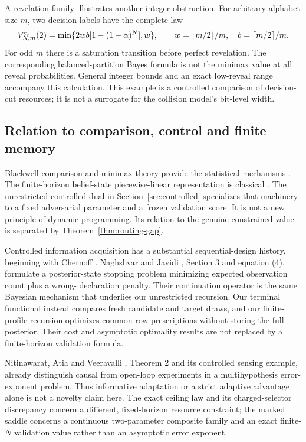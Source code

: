 A revelation family illustrates another integer obstruction. For
arbitrary alphabet size $m$, two decision labels have the complete law
\[
 V^{\rm er}_{N,m}(2)=\min\{2wb[1-(1-\alpha)^N],w\},\qquad
 w=\lfloor m/2\rfloor/m,\quad b=\lceil m/2\rceil/m.
\]
For odd $m$ there is a saturation transition before perfect revelation.
The corresponding balanced-partition Bayes formula is not the minimax
value at all reveal probabilities. General integer bounds and an exact
low-reveal range accompany this calculation. This example is a
controlled comparison of decision-cut resources; it is not a surrogate
for the collision model's bit-level width.

\subsection{Relation to comparison, control and finite memory}
Blackwell comparison and minimax theory provide the statistical
mechanisms \cite{Blackwell,Sion}. The finite-horizon belief-state
piecewise-linear representation is classical \cite{SmallwoodSondik}.
The unrestricted controlled dual in Section~\ref{sec:controlled}
specializes that machinery to a fixed adversarial parameter and a frozen
validation score. It is not a new principle of dynamic programming.
Its relation to the genuine constrained value is separated by
Theorem~\ref{thm:routing-gap}.

Controlled information acquisition has a substantial sequential-design
history, beginning with Chernoff \cite{Chernoff}. Naghshvar and Javidi
\cite{NJ}, Section 3 and equation (4), formulate a posterior-state
stopping problem minimizing expected observation count plus a wrong-
declaration penalty. Their continuation operator is the same Bayesian
mechanism that underlies our unrestricted recursion. Our terminal
functional instead compares fresh candidate and target draws, and our
finite-profile recursion optimizes common row prescriptions without
storing the full posterior. Their cost and asymptotic optimality results
are not replaced by a finite-horizon validation formula.

Nitinawarat, Atia and Veeravalli \cite{NAV}, Theorem 2 and its controlled
sensing example, already distinguish causal from open-loop experiments
in a multihypothesis error-exponent problem. Thus informative adaptation
or a strict adaptive advantage alone is not a novelty claim here.
The exact ceiling law and its charged-selector discrepancy concern a
different, fixed-horizon resource constraint; the marked saddle concerns
a continuous two-parameter composite family and an exact finite-$N$
validation value rather than an asymptotic error exponent.

